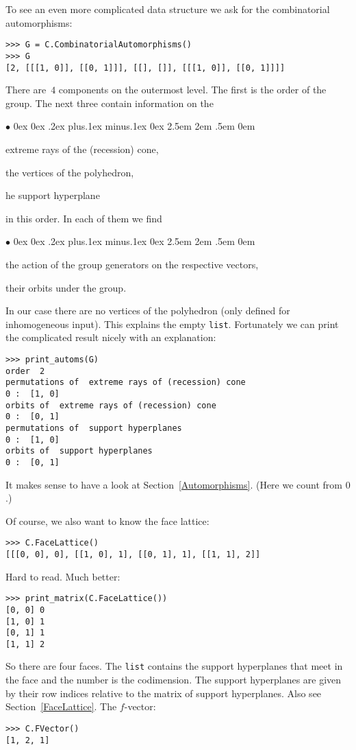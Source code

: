 \documentclass[12pt,a4paper]{scrartcl}
\newcommand{\stdli}{ \topsep0ex \partopsep0ex %
\parsep.2ex plus.1ex minus.1ex \itemsep0ex%
\leftmargin2.5em \labelwidth2em \labelsep.5em \rightmargin0em}%
\renewenvironment{itemize}{\begin{list}{{$\bullet$}}{\stdli}}{\end{list}}
\theoremstyle{definition}
\begin{document}
\begin{small}
To see an even more complicated data structure we ask for the combinatorial automorphisms:
\begin{Verbatim}
>>> G = C.CombinatorialAutomorphisms()
>>> G
[2, [[[1, 0]], [[0, 1]]], [[], []], [[[1, 0]], [[0, 1]]]]
\end{Verbatim}
There are~$4$ components on the outermost level. The first is the order of the group. The next three contain information on the
\begin{itemize}
	\item extreme rays of the (recession) cone,
	\item the vertices of the polyhedron,
	\item he support hyperplane
\end{itemize}
in this order. In each of them we find
\begin{itemize}
	\item the action of the group generators on the respective vectors,
	\item their orbits under the group.
\end{itemize}
In our case there are no vertices of the polyhedron (only defined for inhomogeneous input). This explains the empty \verb|list|. Fortunately we can print the complicated result nicely with an explanation:
\begin{Verbatim}
>>> print_automs(G)
order  2
permutations of  extreme rays of (recession) cone
0 :  [1, 0]
orbits of  extreme rays of (recession) cone
0 :  [0, 1]
permutations of  support hyperplanes
0 :  [1, 0]
orbits of  support hyperplanes
0 :  [0, 1]
\end{Verbatim}
It makes sense to have a look at Section~\ref{Automorphisms}. (Here we count from $0$.)

Of course, we also want to know the face lattice:
\begin{Verbatim}
>>> C.FaceLattice()
[[[0, 0], 0], [[1, 0], 1], [[0, 1], 1], [[1, 1], 2]]
\end{Verbatim}
Hard to read. Much better:
\begin{Verbatim}
>>> print_matrix(C.FaceLattice())
[0, 0] 0
[1, 0] 1
[0, 1] 1
[1, 1] 2
\end{Verbatim}
So there are four faces. The \verb|list| contains the support hyperplanes that meet in the face and the number is the codimension. The support hyperplanes are given by their row indices relative to the matrix of support hyperplanes. Also see Section~\ref{FaceLattice}. The $f$-vector:
\begin{Verbatim}
>>> C.FVector()
[1, 2, 1]
\end{Verbatim}


\end{small}
\end{document}
